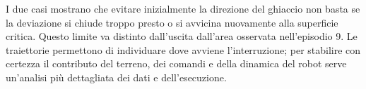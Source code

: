 \documentclass[11pt,a4paper]{article}
\begin{document}
I due casi mostrano che evitare inizialmente la direzione del ghiaccio non basta se la deviazione si chiude troppo presto o si avvicina nuovamente alla superficie critica. Questo limite va distinto dall'uscita dall'area osservata nell'episodio 9. Le traiettorie permettono di individuare dove avviene l'interruzione; per stabilire con certezza il contributo del terreno, dei comandi e della dinamica del robot serve un'analisi più dettagliata dei dati e dell'esecuzione.
\end{document}

